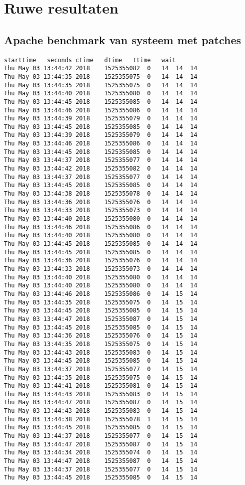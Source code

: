 \section{Ruwe resultaten}
\subsection{Apache benchmark van systeem met patches}

\begin{lstlisting}[caption={Eerste 50 resultaten}, basicstyle=\footnotesize]
starttime	seconds	ctime	dtime	ttime	wait
Thu May 03 13:44:42 2018	1525355082	0	14	14	14
Thu May 03 13:44:35 2018	1525355075	0	14	14	14
Thu May 03 13:44:35 2018	1525355075	0	14	14	14
Thu May 03 13:44:40 2018	1525355080	0	14	14	14
Thu May 03 13:44:45 2018	1525355085	0	14	14	14
Thu May 03 13:44:46 2018	1525355086	0	14	14	14
Thu May 03 13:44:39 2018	1525355079	0	14	14	14
Thu May 03 13:44:45 2018	1525355085	0	14	14	14
Thu May 03 13:44:39 2018	1525355079	0	14	14	14
Thu May 03 13:44:46 2018	1525355086	0	14	14	14
Thu May 03 13:44:45 2018	1525355085	0	14	14	14
Thu May 03 13:44:37 2018	1525355077	0	14	14	14
Thu May 03 13:44:42 2018	1525355082	0	14	14	14
Thu May 03 13:44:37 2018	1525355077	0	14	14	14
Thu May 03 13:44:45 2018	1525355085	0	14	14	14
Thu May 03 13:44:38 2018	1525355078	0	14	14	14
Thu May 03 13:44:36 2018	1525355076	0	14	14	14
Thu May 03 13:44:33 2018	1525355073	0	14	14	14
Thu May 03 13:44:40 2018	1525355080	0	14	14	14
Thu May 03 13:44:46 2018	1525355086	0	14	14	14
Thu May 03 13:44:40 2018	1525355080	0	14	14	14
Thu May 03 13:44:45 2018	1525355085	0	14	14	14
Thu May 03 13:44:45 2018	1525355085	0	14	14	14
Thu May 03 13:44:36 2018	1525355076	0	14	14	14
Thu May 03 13:44:33 2018	1525355073	0	14	14	14
Thu May 03 13:44:40 2018	1525355080	0	14	14	14
Thu May 03 13:44:40 2018	1525355080	0	14	14	14
Thu May 03 13:44:46 2018	1525355086	0	14	15	14
Thu May 03 13:44:35 2018	1525355075	0	14	15	14
Thu May 03 13:44:45 2018	1525355085	0	14	15	14
Thu May 03 13:44:47 2018	1525355087	0	14	15	14
Thu May 03 13:44:45 2018	1525355085	0	14	15	14
Thu May 03 13:44:36 2018	1525355076	0	14	15	14
Thu May 03 13:44:35 2018	1525355075	0	14	15	14
Thu May 03 13:44:43 2018	1525355083	0	14	15	14
Thu May 03 13:44:45 2018	1525355085	0	14	15	14
Thu May 03 13:44:37 2018	1525355077	0	14	15	14
Thu May 03 13:44:35 2018	1525355075	0	14	15	14
Thu May 03 13:44:41 2018	1525355081	0	14	15	14
Thu May 03 13:44:43 2018	1525355083	0	14	15	14
Thu May 03 13:44:47 2018	1525355087	0	14	15	14
Thu May 03 13:44:43 2018	1525355083	0	14	15	14
Thu May 03 13:44:38 2018	1525355078	1	14	15	14
Thu May 03 13:44:45 2018	1525355085	0	14	15	14
Thu May 03 13:44:37 2018	1525355077	0	14	15	14
Thu May 03 13:44:47 2018	1525355087	0	14	15	14
Thu May 03 13:44:34 2018	1525355074	0	14	15	14
Thu May 03 13:44:47 2018	1525355087	0	14	15	14
Thu May 03 13:44:37 2018	1525355077	0	14	15	14
Thu May 03 13:44:45 2018	1525355085	0	14	15	14


\end{lstlisting}


